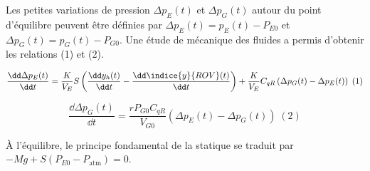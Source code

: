 Les petites variations de pression $\Delta p_E(t)$ et $\Delta p_G(t)$ autour du point d’équilibre peuvent être
définies par $\Delta p_E(t) = p_E(t) - P_{E0}$ et $\Delta p_G(t) = p_G(t) -P_{G0}$.
Une étude de mécanique des fluides a permis d’obtenir les relations (1) et (2).

$$
\dfrac{\dd \Delta p_E(t)}{\dd t} 
= \dfrac{K}{V_E} S
\left( \dfrac{\dd  y_h(t)}{\dd t} -\dfrac{\dd  \indice{y}{ROV}(t)}{\dd t}\right)  
+\dfrac{K}{V_E} C_{qR}\left(\Delta p_G(t)-\Delta p_E(t)\right) \; (1)
$$

$$
\dfrac{\dd \Delta p_G(t)}{\dd t}=\dfrac{rP_{G0}C_{qR}}{V_{G0}}\left(\Delta p_E(t)-\Delta p_G(t)\right)  \; (2)
$$


\fi

% 
% 
% 
% 
\ifprof
\else
À l'équilibre, le principe fondamental de la statique se traduit par $-Mg + S(P_{E0}-P_{\text{atm}})=0$.

%
%  
%

